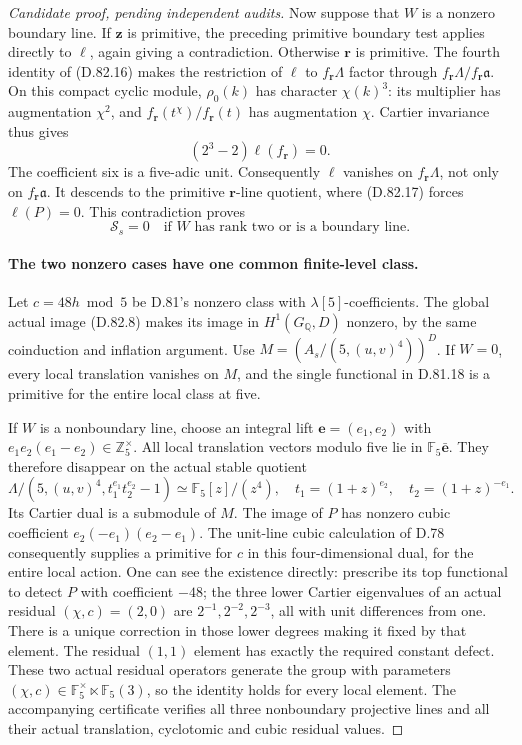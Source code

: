 \begin{proof}[Candidate proof, pending independent audits]
Now suppose that \(W\) is a nonzero boundary line.
If \(\mathbf z\) is primitive, the preceding primitive
boundary test applies directly to \(\ell\), again giving
a contradiction. Otherwise \(\mathbf r\) is primitive.
The fourth identity of (D.82.16) makes the restriction of
\(\ell\) to \(f_{\mathbf r}\Lambda\) factor through
\(f_{\mathbf r}\Lambda/f_{\mathbf r}\mathfrak a\).
On this compact cyclic module, \(\rho_0(k)\) has character
\(\chi(k)^3\): its multiplier has augmentation \(\chi^2\),
and \(f_{\mathbf r}(t^\chi)/f_{\mathbf r}(t)\) has
augmentation \(\chi\). Cartier invariance thus gives
\[
                  (2^3-2)\ell(f_{\mathbf r})=0.
 \]
The coefficient six is a five-adic unit. Consequently
\(\ell\) vanishes on \(f_{\mathbf r}\Lambda\), not only
on \(f_{\mathbf r}\mathfrak a\). It descends to the
primitive \(\mathbf r\)-line quotient, where (D.82.17)
forces \(\ell(P)=0\). This contradiction proves
\[
           \mathcal S_s=0
       \quad\text{if \(W\) has rank two or is a boundary line.}
                                                               \tag{D.82.18}
\]

\paragraph{The two nonzero cases have one common finite-level class.}
Let \(c=48h\bmod5\) be D.81's nonzero class with
\(\lambda[5]\)-coefficients. The global actual image
(D.82.8) makes its image in \(H^1(G_{\mathbb Q},D)\)
nonzero, by the same coinduction and inflation argument.
Use \(M=(A_s/(5,(u,v)^4))^D\).
If \(W=0\), every local translation vanishes on \(M\),
and the single functional in D.81.18 is a primitive
for the entire local class at five.

If \(W\) is a nonboundary line, choose an integral lift
\(\mathbf e=(e_1,e_2)\) with
\(e_1e_2(e_1-e_2)\in\mathbb Z_5^\times\).
All local translation vectors modulo five lie in
\(\mathbb F_5\bar{\mathbf e}\).
They therefore disappear on the actual stable quotient
\[
 \Lambda/(5,(u,v)^4,t_1^{e_1}t_2^{e_2}-1)
       \simeq\mathbb F_5[z]/(z^4),\quad
             t_1=(1+z)^{e_2},\quad t_2=(1+z)^{-e_1}.
                                                               \tag{D.82.19}
\]
Its Cartier dual is a submodule of \(M\).
The image of \(P\) has nonzero cubic coefficient
\(e_2(-e_1)(e_2-e_1)\). The unit-line cubic calculation
of D.78 consequently supplies a primitive for \(c\)
in this four-dimensional dual, for the entire local action.
One can see the existence directly: prescribe its top
functional to detect \(P\) with coefficient \(-48\);
the three lower Cartier eigenvalues of an actual
residual \((\chi,c)=(2,0)\) are \(2^{-1},2^{-2},2^{-3}\),
all with unit differences from one. There is a unique
correction in those lower degrees making it fixed by
that element. The residual \((1,1)\) element has exactly
the required constant defect. These two actual residual
operators generate the group with parameters
\((\chi,c)\in\mathbb F_5^\times\ltimes\mathbb F_5(3)\),
so the identity holds for every local element.
The accompanying certificate verifies all three
nonboundary projective lines and all their actual
translation, cyclotomic and cubic residual values.


\end{proof}
